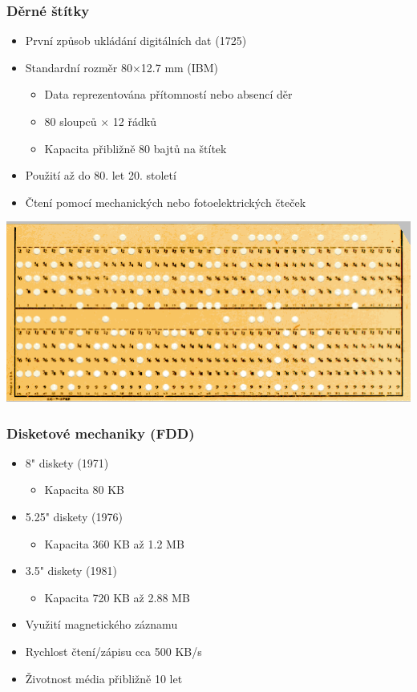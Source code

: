 \documentclass[aspectratio=43]{beamer}
\begin{document}
\begin{frame}
\frametitle{Děrné štítky}
\begin{itemize}
\item První způsob ukládání digitálních dat (1725)
\item Standardní rozměr 80×12.7 mm (IBM)
  \begin{itemize}
  \item Data reprezentována přítomností nebo absencí děr
  \item 80 sloupců × 12 řádků
  \item Kapacita přibližně 80 bajtů na štítek
  \end{itemize}
\item Použití až do 80. let 20. století
\item Čtení pomocí mechanických nebo fotoelektrických čteček
\end{itemize}

\begin{center}
        \includegraphics[width=0.85\linewidth]{extrahovane_obrazky/stitek.png}
    \end{center}

\end{frame}

\begin{frame}
\frametitle{Disketové mechaniky (FDD)}
\begin{itemize}
\item 8" diskety (1971)
  \begin{itemize}
  \item Kapacita 80 KB
  \end{itemize}
\item 5.25" diskety (1976)
  \begin{itemize}
  \item Kapacita 360 KB až 1.2 MB
  \end{itemize}
\item 3.5" diskety (1981)
  \begin{itemize}
  \item Kapacita 720 KB až 2.88 MB
  \end{itemize}
\item Využití magnetického záznamu
\item Rychlost čtení/zápisu cca 500 KB/s
\item Životnost média přibližně 10 let
\end{itemize}
\end{frame}
\end{document}
